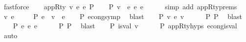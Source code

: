 \begin{isabellebody}
\ fastforce\isanewline
{}\isamarkupfalse%
\isanewline
\ \ \isamarkupfalse%
\ {\isacharparenleft}{\kern0pt}appR{\isacharunderscore}{\kern0pt}ty\ v\ e{}\ e{}\ P{\isacharparenright}{\kern0pt}\isanewline
\ \ \isamarkupfalse%
\ P{}{\isacharcolon}{\kern0pt}\ {\isachardoublequoteopen}v\ {\isasymcdot}\ e{}\ {\isasymsimeq}e\ e{}{\isacharprime}{\kern0pt}{\isachardoublequoteclose}\isanewline
\ \ \ \ \isamarkupfalse%
\ {\isacharparenleft}{\kern0pt}simp\ add{\isacharcolon}{\kern0pt}\ appR{\isacharunderscore}{\kern0pt}ty{\isachardot}{\kern0pt}prems{\isacharparenright}{\kern0pt}\isanewline
\isanewline
\ \ \isamarkupfalse%
\ v{\isacharprime}{\kern0pt}\ e{}{\isacharprime}{\kern0pt}\ \isanewline
\ \ \ \ P{}{\isacharcolon}{\kern0pt}\ {\isachardoublequoteopen}e{}{\isacharprime}{\kern0pt}\ {\isacharequal}{\kern0pt}\ v{\isacharprime}{\kern0pt}\ {\isasymcdot}\ e{}{\isacharprime}{\kern0pt}{\isachardoublequoteclose}\isanewline
\ \ \isamarkupfalse%
\ P{}\ econg{\isacharunderscore}{\kern0pt}symp\ \isamarkupfalse%
\ blast\isanewline
\isanewline
\ \ \isamarkupfalse%
\ P{}{\isacharcolon}{\kern0pt}\ {\isachardoublequoteopen}v\ {\isasymsimeq}e\ v{\isacharprime}{\kern0pt}{\isachardoublequoteclose}\isanewline
\ \ \ \ \isamarkupfalse%
\ P{}\ P{}\ \isamarkupfalse%
\ blast\isanewline
\ \ \isamarkupfalse%
\ P{}{\isacharcolon}{\kern0pt}\ {\isachardoublequoteopen}e{}\ {\isasymsimeq}e\ e{}{\isacharprime}{\kern0pt}{\isachardoublequoteclose}\isanewline
\ \ \ \ \isamarkupfalse%
\ P{}\ P{}\ \isamarkupfalse%
\ blast\isanewline
\isanewline
\ \ \isamarkupfalse%
\ P{}{\isacharcolon}{\kern0pt}\ {\isachardoublequoteopen}is{\isacharunderscore}{\kern0pt}val\ v{\isacharprime}{\kern0pt}{\isachardoublequoteclose}\isanewline
\ \ \ \ \isamarkupfalse%
\ P{}\ appR{\isacharunderscore}{\kern0pt}ty{\isachardot}{\kern0pt}hyps{\isacharparenleft}{\kern0pt}{}{\isacharparenright}{\kern0pt}\ econg{\isacharunderscore}{\kern0pt}is{\isacharunderscore}{\kern0pt}val\ \isamarkupfalse%
\ auto\isanewline
\isanewline
\ \ \isamarkupfalse%

\end{isabellebody}
